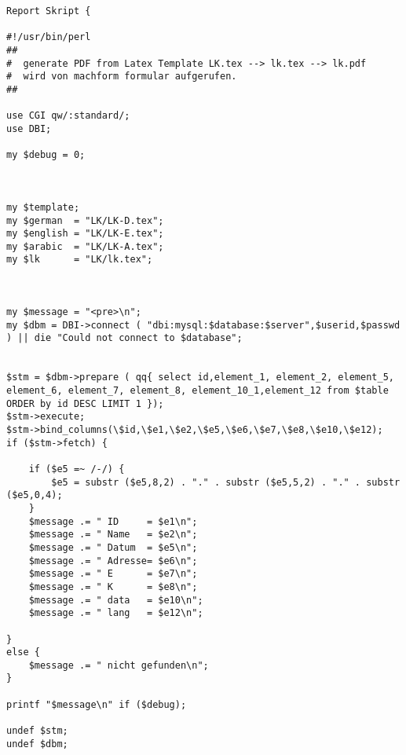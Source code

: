 

\begin{lstlisting}[caption={Formularmanipulation},
label=lst:Beispielcode 2 Perl] Report Skript {

#!/usr/bin/perl                                                                                                                                                                          
##                                                                                                                                                                                       
#  generate PDF from Latex Template LK.tex --> lk.tex --> lk.pdf                                                                                                                         
#  wird von machform formular aufgerufen.                                                                                                                                                
##                                                                                                                                                                                       

use CGI qw/:standard/;
use DBI;

my $debug = 0;



my $template;
my $german  = "LK/LK-D.tex";
my $english = "LK/LK-E.tex";
my $arabic  = "LK/LK-A.tex";
my $lk      = "LK/lk.tex";



my $message = "<pre>\n";
my $dbm = DBI->connect ( "dbi:mysql:$database:$server",$userid,$passwd ) || die "Could not connect to $database";


$stm = $dbm->prepare ( qq{ select id,element_1, element_2, element_5, element_6, element_7, element_8, element_10_1,element_12 from $table  ORDER by id DESC LIMIT 1 });
$stm->execute;
$stm->bind_columns(\$id,\$e1,\$e2,\$e5,\$e6,\$e7,\$e8,\$e10,\$e12);
if ($stm->fetch) {

    if ($e5 =~ /-/) {
        $e5 = substr ($e5,8,2) . "." . substr ($e5,5,2) . "." . substr ($e5,0,4);
    }
    $message .= " ID     = $e1\n";
    $message .= " Name   = $e2\n";
    $message .= " Datum  = $e5\n";
    $message .= " Adresse= $e6\n";
    $message .= " E      = $e7\n";
    $message .= " K      = $e8\n";
    $message .= " data   = $e10\n";
    $message .= " lang   = $e12\n";

}
else {
    $message .= " nicht gefunden\n";
}

printf "$message\n" if ($debug);

undef $stm;
undef $dbm;

    
\end{lstlisting}
